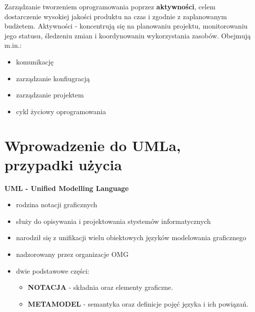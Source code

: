 \documentclass[a4paper]{article}
\begin{document}
Zarządzanie tworzeniem oprogramowania poprzez \textbf{aktywności}, celem dostarczenie wysokiej jakości
produktu na czas i zgodnie z zaplanowanym budżetem. Aktywności - koncentrują się na planowaniu
projektu, monitorowaniu jego statusu, śledzeniu zmian i koordynowaniu wykorzystania zasobów. Obejmują m.in.:
    \begin{itemize}
        \item komunikację
        \item zarządzanie konfiugracją
        \item zarządzanie projektem
        \item cykl życiowy oprogramowania
    \end{itemize}


\section {Wprowadzenie do UMLa, przypadki użycia}

\textbf{UML - Unified Modelling Language}
    \begin{itemize}
        \item rodzina notacji graficznych
        \item służy do opisywania i projektowania stystemów informatycznych
        \item narodził się z unifikacji wielu obiektowych języków modelowania graficznego
        \item nadzorowany przez organizacje OMG
        \item dwie podstawowe części:
        \begin{itemize}
            \item \textbf{NOTACJA} - składnia  oraz elementy graficzne.
            \item \textbf{METAMODEL} - semantyka oraz definicje pojęć języka i ich powiązań.
        \end{itemize}
    \end{itemize}
\end{document}
